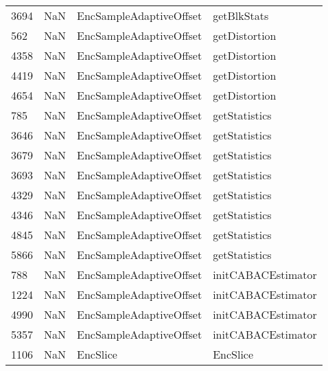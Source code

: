 \begin{tabular}{llll}
3694 &                   NaN &    EncSampleAdaptiveOffset &                               getBlkStats \\
562  &                   NaN &    EncSampleAdaptiveOffset &                             getDistortion \\
4358 &                   NaN &    EncSampleAdaptiveOffset &                             getDistortion \\
4419 &                   NaN &    EncSampleAdaptiveOffset &                             getDistortion \\
4654 &                   NaN &    EncSampleAdaptiveOffset &                             getDistortion \\
785  &                   NaN &    EncSampleAdaptiveOffset &                             getStatistics \\
3646 &                   NaN &    EncSampleAdaptiveOffset &                             getStatistics \\
3679 &                   NaN &    EncSampleAdaptiveOffset &                             getStatistics \\
3693 &                   NaN &    EncSampleAdaptiveOffset &                             getStatistics \\
4329 &                   NaN &    EncSampleAdaptiveOffset &                             getStatistics \\
4346 &                   NaN &    EncSampleAdaptiveOffset &                             getStatistics \\
4845 &                   NaN &    EncSampleAdaptiveOffset &                             getStatistics \\
5866 &                   NaN &    EncSampleAdaptiveOffset &                             getStatistics \\
788  &                   NaN &    EncSampleAdaptiveOffset &                        initCABACEstimator \\
1224 &                   NaN &    EncSampleAdaptiveOffset &                        initCABACEstimator \\
4990 &                   NaN &    EncSampleAdaptiveOffset &                        initCABACEstimator \\
5357 &                   NaN &    EncSampleAdaptiveOffset &                        initCABACEstimator \\
1106 &                   NaN &                   EncSlice &                                  EncSlice \\

\end{tabular}
